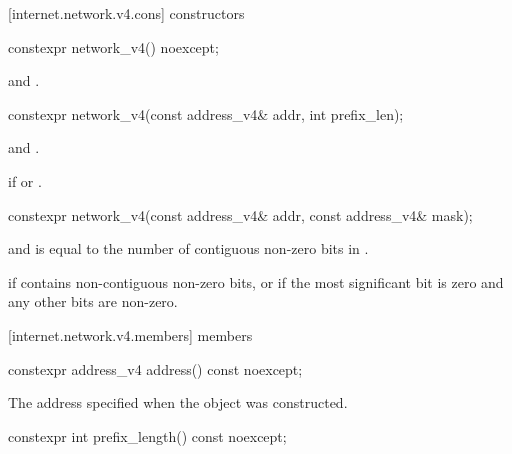 [internet.network.v4.cons]{ constructors}

\begin{itemdecl}
constexpr network_v4() noexcept;
\end{itemdecl}

\begin{itemdescr}
\pnum
\postconditions {} and .
\end{itemdescr}

\begin{itemdecl}
constexpr network_v4(const address_v4& addr, int prefix_len);
\end{itemdecl}

\begin{itemdescr}
\pnum
\postconditions {} and .

\pnum
\remarks {} if  or .
\end{itemdescr}

\begin{itemdecl}
constexpr network_v4(const address_v4& addr, const address_v4& mask);
\end{itemdecl}

\begin{itemdescr}
\pnum
\postconditions {} and  is equal to the number of contiguous non-zero bits in .

\pnum
\remarks {} if  contains non-contiguous non-zero bits, or if the most significant bit is zero and any other bits are non-zero.
\end{itemdescr}



[internet.network.v4.members]{ members}

\begin{itemdecl}
constexpr address_v4 address() const noexcept;
\end{itemdecl}

\begin{itemdescr}
\pnum
\returns The address specified when the  object was constructed.
\end{itemdescr}

\begin{itemdecl}
constexpr int prefix_length() const noexcept;
\end{itemdecl}

